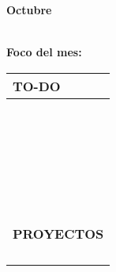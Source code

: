 {\raggedleft
	\fontsize{25}{50}\selectfont
	\textbf{Octubre}\\
}



	\textbf{\\Foco del mes:} \dotfill
	\renewcommand{\arraystretch}{1.5}\scriptsize
		\begin{longtabu} to \textwidth { X[l]}
		\centering \small{\textbf{TO-DO}} \\
		\toprule
		\makebox{$\square$} \dotfill\\
		\makebox{$\square$} \dotfill\\
		\makebox{$\square$} \dotfill\\
		\makebox{$\square$} \dotfill\\
		\makebox{$\square$} \dotfill\\
		\makebox{$\square$} \dotfill\\
		\makebox{$\square$} \dotfill\\
		\makebox{$\square$} \dotfill\\
		\makebox{$\square$} \dotfill\\
		\makebox{$\square$} \dotfill\\
		\makebox{$\square$} \dotfill\\
		\makebox{$\square$} \dotfill\\
		\makebox{$\square$} \dotfill\\
		\makebox{$\square$} \dotfill\\
		\makebox{$\square$} \dotfill\\
		\makebox{$\square$} \dotfill\\
		\makebox{$\square$} \dotfill\\
		\makebox{$\square$} \dotfill\\
		\makebox{$\square$} \dotfill\\
		\makebox{$\square$} \dotfill\\
		\makebox{$\square$} \dotfill\\
		\makebox{$\square$} \dotfill\\
		\makebox{$\square$} \dotfill\\
		\makebox{$\square$} \dotfill\\
		\makebox{$\square$} \dotfill\\

		\bottomrule

		\\
		\small{\textbf{PROYECTOS}} \\
		\makebox{$\square$} \dotfill\\
		\makebox{$\square$} \dotfill\\
		\makebox{$\square$} \dotfill\\
		\makebox{$\square$} \dotfill\\
	\end{longtabu}


